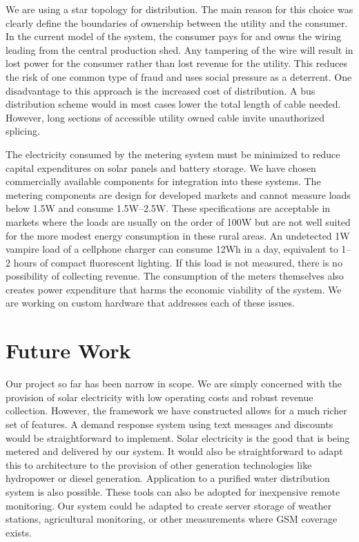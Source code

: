 \documentclass[conference]{IEEEtran}
\begin{document}
We are using a star topology for distribution.  The main reason for this
choice was clearly define the boundaries of ownership between the utility
and the consumer.  In the current model of the system, the consumer pays for
and owns the wiring leading from the central production shed.  Any tampering
of the wire will result in lost power for the consumer rather than lost
revenue for the utility.  This reduces the risk of one common type of fraud
and uses social pressure as a deterrent.
One disadvantage to this approach is the increased cost of distribution.
A bus distribution scheme would in most cases lower the total length of
cable needed.  However, long sections of accessible utility owned cable
invite unauthorized splicing.


The electricity consumed by the metering system must be minimized to
reduce capital expenditures on solar panels and battery storage.  We
have chosen commercially available components for integration into
these systems.  The metering components are design for developed markets
and cannot measure loads below 1.5W and consume 1.5W--2.5W.  These
specifications are acceptable in markets where the loads are usually
on the order of 100W but are not well suited for the more modest
energy consumption in these rural areas.  An undetected 1W vampire load of a
cellphone charger can consume 12Wh in a day, equivalent to 1--2 hours
of compact fluorescent lighting.  If this load is not measured, there
is no possibility of collecting revenue.  The consumption of the meters
themselves also creates power expenditure that harms the economic viability
of the system.  We are working on custom hardware that addresses each
of these issues.


\section{Future Work}
Our project so far has been narrow in scope.  We are simply concerned with the
provision of solar electricity with low operating costs and robust revenue
collection.  However, the framework we have constructed allows for a much
richer set of features.
A demand response system using text messages and discounts
would be straightforward to implement.
Solar electricity is the good that is being metered and delivered by our
system.  It would also be straightforward to adapt this to architecture
to the provision of other generation technologies like hydropower or
diesel generation.  Application to a purified water distribution system
is also possible.
These tools can also be adopted for inexpensive remote monitoring.  Our
system could be adapted to create server storage of weather stations,
agricultural monitoring, or other measurements where GSM coverage exists.
\end{document}
